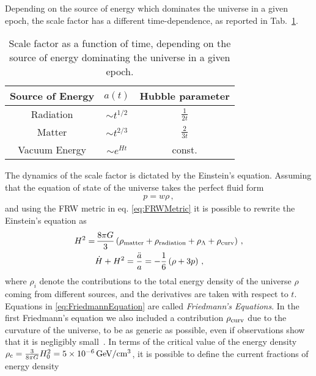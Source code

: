 \documentclass[12pt,a4paper]{book}
\begin{document}
Depending on the source of energy which dominates the universe in a given epoch, the scale factor has a different time-dependence, as reported in Tab.~\ref{tab:ScaleFactor}.
\begin{small}
\renewcommand{\arraystretch}{1.6}
\begin{table}[h!]
\begin{center}
\begin{tabular}{ccc}
\hline
Source of Energy & $a(t)$ & Hubble parameter  \\
\hline
Radiation & $\sim t^{1/2}$ & $\frac{1}{2 t}$ \\
Matter & $\sim t^{2/3}$ & $\frac{2}{3 t}$ \\
Vacuum Energy & $\sim e^{H t}$ & const.\\
\hline
\end{tabular}
\end{center}
\caption{Scale factor as a function of time, depending on the source of energy dominating the universe in a given epoch.}
\label{tab:ScaleFactor}
\end{table}
\end{small}
The dynamics of the scale factor is dictated by the Einstein's equation. Assuming that the equation of state of the universe takes the perfect fluid form
\begin{align}
\label{eq:EqStatePerfectFluid}
p = w \rho \,,
\end{align}
and using the FRW metric in eq. \eqref{eq:FRWMetric} it is possible to rewrite the Einstein's equation as
\begin{align}
\label{eq:FriedmannEquation}
H^2 =& \, \frac{8 \pi G}{3} \left(\rho_{\rm matter} + \rho_{\rm radiation} + \rho_{\Lambda} + \rho_{\rm curv}\right) \,, \nonumber \\  
&\dot{H} + H^2 = \frac{\ddot{a}}{a} = -\frac{1}{6} \left(\rho + 3 p\right)\,,
\end{align}
where $\rho_i$ denote the contributions to the total energy density of the universe $\rho$ coming from different sources, and the derivatives are taken with respect to $t$. Equations in \eqref{eq:FriedmannEquation} are called \textit{Friedmann's Equations}. In the first Friedmann's equation we also included a contribution $\rho_{\rm curv}$ due to the curvature of the universe, to be as generic as possible, even if observations show that it is negligibly small~\cite{Ade:2013zuv}. In terms of the critical value of the energy density $\rho_{\rm c} = \frac{3}{8 \pi G} H_0^2 = 5 \times 10^{-6} \, \text{GeV}/\text{cm}^3$, it is possible to define the current fractions of energy density
\end{document}
